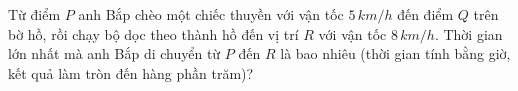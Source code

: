 \documentclass[12pt, a4paper]{article}
\begin{document}
{\begin{center}
\end{center}

Từ điểm \( P \) anh Bắp chèo một chiếc thuyền với vận tốc \( 5 \, km/h \) đến điểm \( Q \) trên bờ hồ, rồi chạy bộ dọc theo thành hồ đến vị trí \( R \) với vận tốc \( 8 \, km/h \). Thời gian lớn nhất mà anh Bắp di chuyển từ \( P \) đến \( R \) là bao nhiêu (thời gian tính bằng giờ, kết quả làm tròn đến hàng phần trăm)?}
\end{document}
